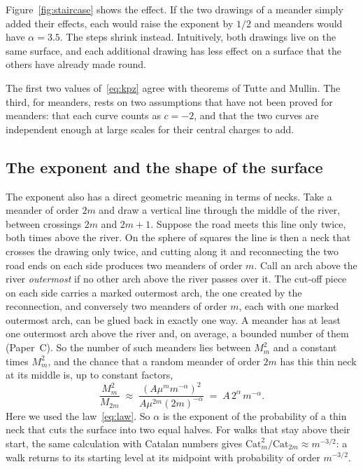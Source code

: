 Figure~\ref{fig:staircase} shows the effect. If the two drawings of a meander simply added their
effects, each would raise the exponent by $1/2$ and meanders would have $\alpha=3.5$. The steps
shrink instead. Intuitively, both drawings live on the same surface, and each additional drawing
has less effect on a surface that the others have already made round.

The first two values of~\eqref{eq:kpz} agree with theorems of Tutte and Mullin. The third, for
meanders, rests on two assumptions that have not been proved for meanders: that each curve
counts as $c=-2$, and that the two curves are independent enough at large scales for their
central charges to add.

\subsection{The exponent and the shape of the surface}\label{sec:shape}

The exponent also has a direct geometric meaning in terms of necks. Take a meander of order $2m$
and draw a vertical line through the middle of the river, between crossings $2m$ and $2m+1$.
Suppose the road meets this line only twice, both times above the river. On the sphere of squares
the line is then a neck that crosses the drawing only twice, and cutting along it and reconnecting
the two road ends on each side produces two meanders of order $m$. Call an arch above the river
\emph{outermost} if no other arch above the river passes over it. The cut-off piece on each side
carries a marked outermost arch, the one created by the reconnection, and conversely two meanders
of order $m$, each with one marked outermost arch, can be glued back in exactly one way. A meander
has at least one outermost arch above the river and, on average, a bounded number of them
(Paper~C). So the number of such meanders lies between $M_m^2$ and a constant times $M_m^2$, and
the chance that a random meander of order $2m$ has this thin neck at its middle is, up to
constant factors,
\[ \frac{M_m^2}{M_{2m}} \;\approx\; \frac{(A\mu^m m^{-\alpha})^2}{A\mu^{2m}(2m)^{-\alpha}} \;=\; A\,2^{\alpha}\, m^{-\alpha} .\]
Here we used the law~\eqref{eq:law}. So $\alpha$ is the exponent of the probability of a thin
neck that cuts the surface into two equal halves. For walks that stay above their start, the same calculation with
Catalan numbers gives $\mathrm{Cat}_m^2/\mathrm{Cat}_{2m}\approx m^{-3/2}$: a walk returns to its starting level at its
midpoint with probability of order $m^{-3/2}$.

